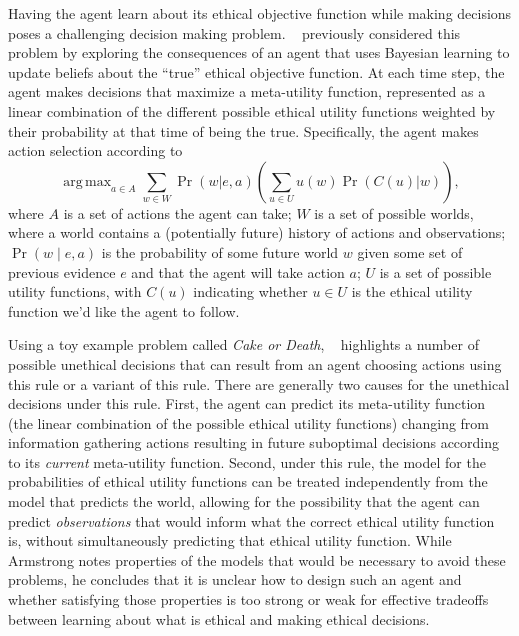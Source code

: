 \documentclass[11pt]{article}
\DeclareMathOperator*{\argmax}{arg\,max}
\begin{document}
Having the agent learn about its ethical objective function while making decisions poses a challenging decision making problem. ~\cite{AAAIW1510183} previously considered this problem by exploring the consequences of an agent that uses Bayesian learning to update beliefs about the ``true'' ethical objective function. At each time step, the agent makes decisions that maximize a meta-utility function, represented as a linear combination of the different possible ethical utility functions weighted by their probability at that time of being the true. Specifically, the agent makes action selection according to
\begin{equation}
\label{eq:armstrong}
\argmax_{a \in A} \sum_{w \in W} \Pr(w | e, a) \left( \sum_{u \in U} u(w) \Pr(C(u)|w) \right),
\end{equation}
where $A$ is a set of actions the agent can take; $W$ is a set of possible worlds, where a world contains a (potentially future) history of actions and observations; $\Pr(w \mid e, a)$ is the probability of some future world $w$ given some set of previous evidence $e$ and that the agent will take action $a$; $U$ is a set of possible utility functions, with $C(u)$ indicating whether $u \in U$ is the ethical utility function we'd like the agent to follow.

Using a toy example problem called {\em Cake or Death}, ~\cite{AAAIW1510183} highlights a number of possible unethical decisions that can result from an agent choosing actions using this rule or a variant of this rule. There are generally two causes for the unethical decisions under this rule. First, the agent can predict its meta-utility function (the linear combination of the possible ethical utility functions) changing from information gathering actions resulting in future suboptimal decisions according to its {\em current} meta-utility function. Second, under this rule, the model for the probabilities of ethical utility functions can be treated independently from the model that predicts the world, allowing for the possibility that the agent can predict {\em observations} that would inform what the correct ethical utility function is, without simultaneously predicting that ethical utility function. While Armstrong notes properties of the models that would be necessary to avoid these problems, he concludes that it is unclear how to design such an agent and whether satisfying those properties is too strong or weak for effective tradeoffs between learning about what is ethical and making ethical decisions.
\end{document}
